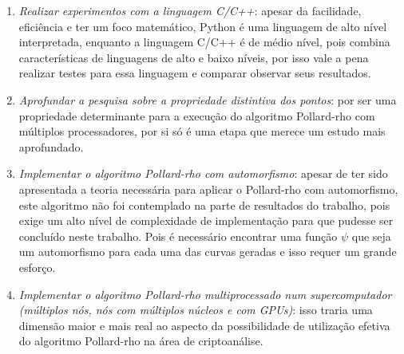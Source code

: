 \begin{enumerate}
	\item \textit{Realizar experimentos com a linguagem C/C++}: apesar da facilidade, eficiência e ter um foco matemático, Python é uma linguagem de alto nível interpretada, enquanto a linguagem C/C++ é de médio nível, pois combina características de linguagens de alto e baixo níveis, por isso vale a pena realizar testes para essa linguagem e comparar observar seus resultados.
	\item \textit{Aprofundar a pesquisa sobre a propriedade distintiva dos pontos}: por ser uma propriedade determinante para a execução do algoritmo Pollard-rho com múltiplos processadores, por si só é uma etapa que merece um estudo mais aprofundado.
	\item \textit{Implementar o algoritmo Pollard-rho com automorfismo}: apesar de ter sido apresentada a teoria necessária para aplicar o Pollard-rho com automorfismo, este algoritmo não foi contemplado na parte de resultados do trabalho, pois exige um alto nível de complexidade de implementação para que pudesse ser concluído neste trabalho. Pois é necessário encontrar uma função \(\psi\) que seja um automorfismo para cada uma das curvas geradas e isso requer um grande esforço.
	\item \textit{Implementar o algoritmo Pollard-rho multiprocessado num supercomputador (múltiplos nós, nós com múltiplos núcleos e com GPUs)}: isso traria uma dimensão maior e mais real ao aspecto da possibilidade de utilização efetiva do algoritmo Pollard-rho na área de criptoanálise.
\end{enumerate}
